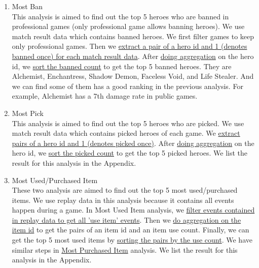 \documentclass{article}
\begin{document}
\begin{enumerate}
    \item Most Ban \\
    This analysis is aimed to find out the top 5 heroes who are banned in professional games (only professional game allows banning heroes). We use match result data which contains banned heroes. We first filter games to keep only professional games. Then we \href{https://github.com/Vopaaz/big-data-psg-lgd/blob/master/src/main/scala/MostBan.scala#L29-L30}{extract a pair of a hero id and 1 (denotes banned once) for each match result data}. After \href{https://github.com/Vopaaz/big-data-psg-lgd/blob/master/src/main/scala/MostBan.scala#L31}{doing aggregation} on the hero id, we \href{https://github.com/Vopaaz/big-data-psg-lgd/blob/master/src/main/scala/MostBan.scala#L33}{sort the banned count} to get the top 5 banned heroes. They are Alchemist, Enchantress, Shadow Demon, Faceless Void, and Life Stealer. And we can find some of them has a good ranking in the previous analysis. For example, Alchemist has a 7th damage rate in public games.
    \item Most Pick \\
    This analysis is aimed to find out the top 5 heroes who are picked. We use match result data which contains picked heroes of each game. We \href{https://github.com/Vopaaz/big-data-psg-lgd/blob/master/src/main/scala/MostPick.scala#L34}{extract pairs of a hero id and 1 (denotes picked once)}. After \href{https://github.com/Vopaaz/big-data-psg-lgd/blob/master/src/main/scala/MostPick.scala#L35}{doing aggregation} on the hero id, we \href{https://github.com/Vopaaz/big-data-psg-lgd/blob/master/src/main/scala/MostPick.scala#L37}{sort the picked count} to get the top 5 picked heroes. We list the result for this analysis in the Appendix.
    \item Most Used/Purchased Item \\
    These two analysis are aimed to find out the top 5 most used/purchased items. We use replay data in this analysis because it contains all events happen during a game. In Most Used Item analysis, we \href{https://github.com/Vopaaz/big-data-psg-lgd/blob/master/src/main/scala/MostUsedItem.scala#L38-L40}{filter events contained in replay data to get all 'use item' events}. Then we \href{https://github.com/Vopaaz/big-data-psg-lgd/blob/master/src/main/scala/MostUsedItem.scala#L41-L42}{do aggregation on the item id} to get the pairs of an item id and an item use count. Finally, we can get the top 5 most used items by \href{https://github.com/Vopaaz/big-data-psg-lgd/blob/master/src/main/scala/MostUsedItem.scala#L44}{sorting the pairs by the use count}. We have similar steps in \href{https://github.com/Vopaaz/big-data-psg-lgd/blob/master/src/main/scala/MostPurchasedItem.scala}{Most Purchased Item} analysis. We list the result for this analysis in the Appendix.

\end{enumerate}
\end{document}
